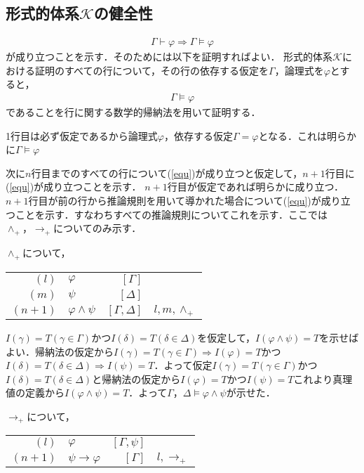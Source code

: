 \documentclass[10pt,b5paper,papersize,dvipdfmx]{jsbook}
\begin{document}
\subsection{形式的体系$\mathcal K$の健全性}
\begin{align}
\Gamma \vdash \varphi \Rightarrow \Gamma \models \varphi
\end{align}
が成り立つことを示す．そのためには以下を証明すればよい．
形式的体系$\mathcal K$における証明のすべての行について，その行の依存する仮定を$\Gamma$，論理式を$\varphi$とすると，
\begin{align}
\label{equ} \Gamma \models \varphi
\end{align}
であることを行に関する数学的帰納法を用いて証明する．\par
1行目は必ず仮定であるから論理式$\varphi$，依存する仮定$\Gamma = \varphi$となる．これは明らかに$\Gamma \models \varphi$ \par
次に$n$行目までのすべての行について(\ref{equ})が成り立つと仮定して，$n+1$行目に(\ref{equ})が成り立つことを示す．
$n+1$行目が仮定であれば明らかに成り立つ．$n+1$行目が前の行から推論規則を用いて導かれた場合について(\ref{equ})が成り立つことを示す．すなわちすべての推論規則についてこれを示す．ここでは$\land_+， \to_+$についてのみ示す．\par
$\land_+$について，
\begin{table}[H]
\begin{tabular}{rlrl}
$(l)$&$\varphi$&$[\Gamma]$& \\
$(m)$&$\psi$&$[\Delta]$& \\
$(n+1)$&$\varphi \land \psi$&$[\Gamma,\Delta]$&$l,m,\land_+$
\end{tabular}
\end{table}
$I(\gamma)=T(\gamma \in \Gamma)$かつ$I(\delta)=T(\delta \in \Delta)$を仮定して，$I(\varphi \land \psi)=T$を示せばよい．帰納法の仮定から$I(\gamma)=T(\gamma \in \Gamma)\Rightarrow I(\varphi)=T$かつ$I(\delta)=T(\delta \in \Delta)\Rightarrow I(\psi)=T$．よって仮定$I(\gamma)=T(\gamma \in \Gamma)$かつ$I(\delta)=T(\delta \in \Delta)$と帰納法の仮定から$I(\varphi)=T$かつ$I(\psi)=T$これより真理値の定義から$I(\varphi \land \psi)=T$．よって$\Gamma，\Delta \models \varphi \land \psi$が示せた．\par
$\to_+$について，
\begin{table}[H]
\begin{tabular}{rlrl}
$(l)$&$\varphi$&$[\Gamma,\psi]$& \\
$(n+1)$&$\psi \to \varphi$&$[\Gamma]$&$l,\to_+$ \\
\end{tabular}
\end{table}
\end{document}
